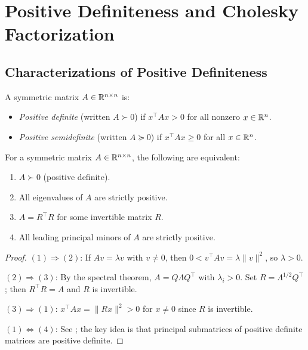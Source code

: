 \documentclass[11pt,a4paper]{article}
\begin{document}
\section{Positive Definiteness and Cholesky Factorization}
\label{sec:positive_definite}

\subsection{Characterizations of Positive Definiteness}

\begin{definition}
\label{def:pd}
A symmetric matrix $A \in \mathbb{R}^{n \times n}$ is:
\begin{itemize}[nosep]
  \item \emph{Positive definite} (written $A \succ 0$) if
        $x^\top A x > 0$ for all nonzero $x \in \mathbb{R}^n$.
  \item \emph{Positive semidefinite} (written $A \succeq 0$) if
        $x^\top A x \geq 0$ for all $x \in \mathbb{R}^n$.
\end{itemize}
\end{definition}

\begin{theorem}
\label{thm:pd_char}
For a symmetric matrix $A \in \mathbb{R}^{n \times n}$, the following are
equivalent:
\begin{enumerate}[nosep]
  \item $A \succ 0$ (positive definite).
  \item All eigenvalues of $A$ are strictly positive.
  \item $A = R^\top R$ for some invertible matrix $R$.
  \item All leading principal minors of $A$ are strictly positive.
\end{enumerate}
\end{theorem}

\begin{proof}
$(1) \Rightarrow (2)$: If $Av = \lambda v$ with $v \neq 0$, then
$0 < v^\top Av = \lambda \|v\|^2$, so $\lambda > 0$.

$(2) \Rightarrow (3)$: By the spectral theorem, $A = Q\Lambda Q^\top$
with $\lambda_i > 0$.  Set $R = \Lambda^{1/2}Q^\top$; then $R^\top R = A$
and $R$ is invertible.

$(3) \Rightarrow (1)$: $x^\top Ax = \|Rx\|^2 > 0$ for $x \neq 0$ since
$R$ is invertible.

$(1) \Leftrightarrow (4)$: See \citet[Theorem~7.2.5]{horn2013}; the key
idea is that principal submatrices of positive definite matrices are
positive definite.
\end{proof}
\end{document}
